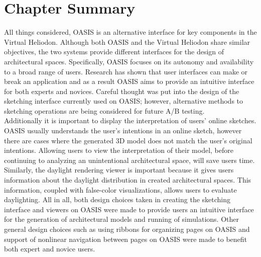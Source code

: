 \section{Chapter Summary}
All things considered, OASIS is an alternative interface for key components in the Virtual Heliodon. Although both OASIS and the Virtual Heliodon share similar objectives, the two systems provide different interfaces for the design of architectural spaces. Specifically, OASIS focuses on its autonomy and availability to a broad range of users. 
Research has shown that user interfaces can make or break an application and as a result OASIS aims to provide an intuitive interface for both experts and novices. Careful thought was put into the design of the sketching interface currently used on OASIS; however, alternative methods to sketching operations are being considered for future A/B testing. \\

Additionally it is important to display the interpretation of users' online sketches. OASIS usually understands the user's intentions in an online sketch, however there are cases where the generated 3D model does not match the user's original intentions.
Allowing  users to view the interpretation of their model, before continuing to analyzing an unintentional architectural space, will save users time.
Similarly, the daylight rendering viewer is important because it gives users information about the daylight distribution in created architectural spaces. 
This information, coupled with false-color visualizations, allows users to evaluate daylighting. All in all, both design choices taken in creating the  sketching interface and viewers on OASIS were made to provide users an intuitive  interface for the generation of architectural models and running of simulations. Other general design choices such as  using ribbons for organizing pages on OASIS and support of nonlinear navigation between pages on OASIS were made to benefit both expert and novice users. \\

